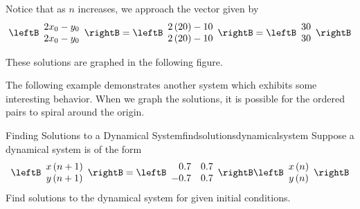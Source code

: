\begin{solution}
Notice that as $n$ increases, we approach the vector given by  
\begin{equation*}
\leftB
\begin{array}{c}
2x_{0}-y_{0} \\
2x_{0}-y_{0}
\end{array}
\rightB
=
\leftB
\begin{array}{r}
2\left(20\right)- 10\\
2\left( 20 \right)-10
\end{array}
\rightB
=
\leftB
\begin{array}{r}
30\\
30
\end{array}
\rightB
\end{equation*}

These solutions are graphed in the following figure. 

\begin{center}
\end{center}

\end{solution}

The following example demonstrates another system which exhibits some interesting behavior. When we graph 
the solutions, it is
possible for the ordered pairs to spiral around the origin.

\begin{example}{Finding Solutions to a Dynamical System}{findsolutionsdynamicalsystem}
Suppose a dynamical system is of the form
\begin{equation*}
\leftB
\begin{array}{c}
x\left( n+1\right) \\
y\left( n+1\right)
\end{array}
\rightB =\leftB 
\begin{array}{rr}
0.7 & 0.7 \\
-0.7 & 0.7
\end{array}
\rightB \leftB
\begin{array}{c}
x\left( n\right) \\
y\left( n\right)
\end{array}
\rightB
\end{equation*}
Find solutions to the dynamical system for given initial conditions.
\end{example}


